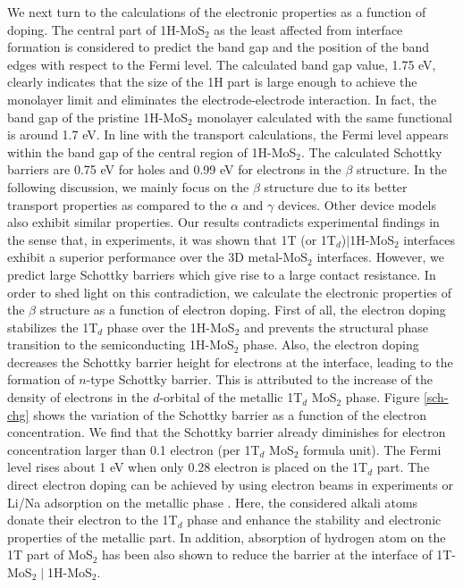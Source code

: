 We next turn to the calculations of the electronic properties as a function of doping.
The central part of 1H-MoS$_2$ as the least affected from interface formation is considered to predict the band gap and the position of the band edges with respect to the Fermi level. The calculated band gap value, 1.75 eV,  clearly indicates that the size of the 1H part is large enough to achieve the monolayer limit and eliminates the electrode-electrode interaction. 
In fact, the band gap of the pristine 1H-MoS$_2$ monolayer calculated with the same functional is around 1.7 eV. 
In line with the transport calculations, the Fermi level appears within the band gap of the central region of 1H-MoS$_2$. The calculated Schottky barriers are 0.75 eV for holes and 0.99 eV for electrons in the $\beta$ structure. In the following discussion, we mainly focus on the $\beta$ structure due to its better transport properties as compared to the  $\alpha$ and  $\gamma$ devices. Other device models also exhibit similar properties. Our results contradicts experimental findings in the sense that, in experiments, it was shown that 1T (or 1T$_d$)$\mid$1H-MoS$_2$ interfaces exhibit a superior performance over the 3D metal-MoS$_2$ interfaces. However, we predict large Schottky barriers which give rise to a large contact resistance. In order to shed light on this contradiction, we calculate the electronic properties of the $\beta$ structure as a function of electron doping.   First of all, the electron doping stabilizes the 1T$_d$ phase over the 1H-MoS$_2$ and prevents the structural phase transition to the semiconducting 1H-MoS$_2$ phase\cite{doi:10.1021/jp4076355}. Also, the electron doping decreases the Schottky barrier height for electrons at the interface, leading to the formation of $n$-type Schottky barrier. This is attributed to the increase of the density of electrons in the $d$-orbital of the metallic 1T$_d$ MoS$_2$ phase.  Figure \ref{sch-chg} shows the variation of the Schottky barrier as a function of the electron concentration. We find that the Schottky barrier already diminishes for electron concentration larger than 0.1 electron (per 1T$_d$ MoS$_2$ formula unit). The Fermi level rises about 1 eV when only 0.28 electron is placed on the 1T$_d$ part. The direct electron doping can be achieved by using electron beams in experiments or Li/Na adsorption on the metallic phase\cite{doi:10.1021/acs.nanolett.6b01186,doi:10.1021/jp4076355} . Here, the considered alkali atoms donate their electron to the 1T$_d$ phase and enhance the stability and electronic properties of the metallic part\cite{doi:10.1021/jp4076355}. In addition, absorption of hydrogen atom on the 1T part of MoS$_2$ has been also shown to reduce the barrier at the interface of 1T-MoS$_2\mid$1H-MoS$_2$\cite{doi:10.1021/acs.nanolett.6b03999,doi:10.1021/acs.chemmater.5b00986}. 

